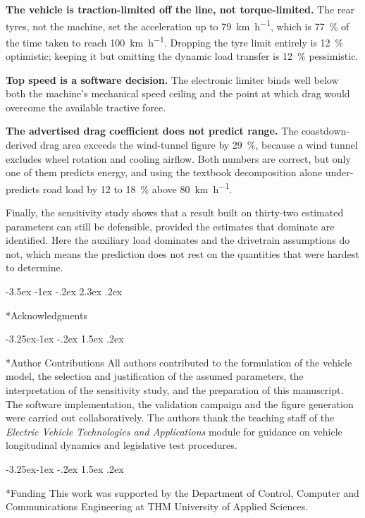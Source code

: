 \documentclass[twocolumn]{article}
\makeatletter
\renewcommand\section{\@startsection{section}{1}{\z@}%
  {-3.5ex \@plus -1ex \@minus -.2ex}%
  {2.3ex \@plus.2ex}%
  {\raggedright\normalfont\Large\bfseries}}
\renewcommand\subsection{\@startsection{subsection}{2}{\z@}%
  {-3.25ex\@plus -1ex \@minus -.2ex}%
  {1.5ex \@plus .2ex}%
  {\raggedright\normalfont\large\bfseries}}
\makeatother
\begin{document}
\textbf{The vehicle is traction-limited off the line, not torque-limited.} The
rear tyres, not the machine, set the acceleration up to
\SI{79}{\kilo\metre\per\hour}, which is \SI{77}{\percent} of the time taken
to reach \SI{100}{\kilo\metre\per\hour}. Dropping the tyre limit entirely is
\SI{12}{\percent} optimistic; keeping it but omitting the dynamic load transfer
is \SI{12}{\percent} pessimistic.

\textbf{Top speed is a software decision.} The electronic limiter binds well
below both the machine's mechanical speed ceiling and the point at which drag
would overcome the available tractive force.

\textbf{The advertised drag coefficient does not predict range.} The
coastdown-derived drag area exceeds the wind-tunnel figure by
\SI{29}{\percent}, because a wind tunnel excludes wheel rotation and cooling
airflow. Both numbers are correct, but only one of them predicts energy, and
using the textbook decomposition alone under-predicts road load by 12 to
\SI{18}{\percent} above \SI{80}{\kilo\metre\per\hour}.

Finally, the sensitivity study shows that a result built on thirty-two
estimated parameters can still be defensible, provided the estimates that
dominate are identified. Here the auxiliary load dominates and the drivetrain
assumptions do not, which means the prediction does not rest on the quantities
that were hardest to determine.

\section*{Acknowledgments}

\subsection*{Author Contributions}
All authors contributed to the formulation of the vehicle model, the selection
and justification of the assumed parameters, the interpretation of the
sensitivity study, and the preparation of this manuscript. The software
implementation, the validation campaign and the figure generation were carried
out collaboratively. The authors thank the teaching staff of the
\emph{Electric Vehicle Technologies and Applications} module for guidance on
vehicle longitudinal dynamics and legislative test procedures.

\subsection*{Funding}
This work was supported by the Department of Control, Computer and
Communications Engineering at THM University of Applied Sciences.
\end{document}
